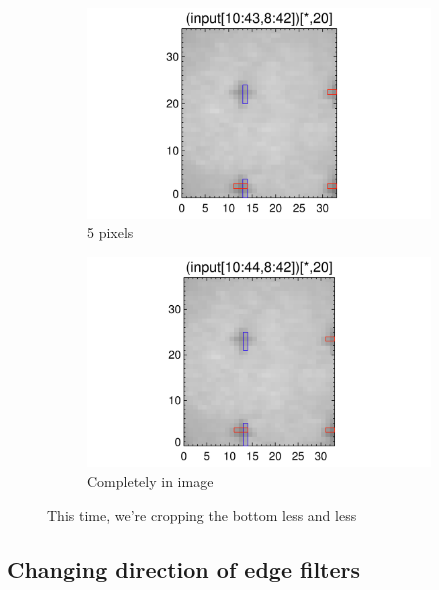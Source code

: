 \documentclass[10pt]{article}
\begin{document}
\begin{figure}[!h]
    \begin{subfigure}[b]{.45\linewidth}
        \centering
        \includegraphics[width=1.3\textwidth]{../plots_tables_images/moarfidcheck_withbothtruncate5.png}
        \caption{5 pixels}
    \end{subfigure}
    \begin{subfigure}[b]{.45\linewidth}
        \centering
        \includegraphics[width=1.3\textwidth]{../plots_tables_images/moarfidcheck_withbothtruncate6.png}
        \caption{Completely in image}
    \end{subfigure}
    \caption{This time, we're cropping the bottom less and less}
    \label{firstplot}
\end{figure}


\subsection{Changing direction of edge filters} %
\label{sub:changing_direction_of_edge_filters}
\end{document}
